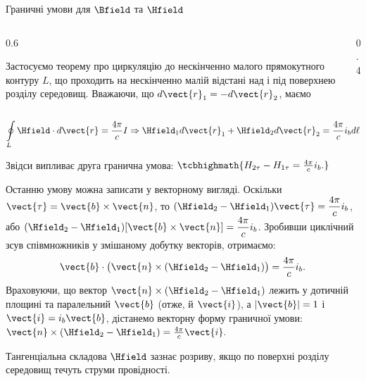 \documentclass[onlytextwidth]{beamer}
\begin{document}
\begin{frame}{Граничні умови для $\Bfield$ та $\Hfield$}{}
\begin{onlyenv}
\begin{columns}
\begin{column}{0.6\linewidth}
\begin{block}{}
					Застосуємо теорему про циркуляцію до нескінченно малого прямокутного
					контуру $L$, що проходить на нескінченно малій відстані над і під поверхнею
					розділу середовищ. Вважаючи, що $d\vect{r}_1 = -d\vect{r}_2$, маємо
				\end{block}
			\end{column}
			\begin{column}{0.4\linewidth}\centering
				
			\end{column}
		\end{columns}
		\begin{block}{}
			\begin{equation*}
				\oint\limits_L \Hfield\cdot d\vect{r} = \frac{4\pi}cI \Rightarrow \Hfield_1 d\vect{r}_1 +
				\Hfield_2 d\vect{r}_2 = \frac{4\pi}c i_b d\ell
			\end{equation*}
		\end{block}
		\begin{block}{}
			Звідси випливає друга гранична умова:
			\(
			\tcbhighmath{
				H_{2\tau} - H_{1\tau} = \frac{4\pi}c i_b.
			}
			\)
		\end{block}
		\begin{block}{}\justifying\scriptsize
			Останню умову можна записати у векторному вигляді. Оскільки
			$\vect{\tau}=\vect{b}\times\vect{n}$, то
			$(\Hfield_2-\Hfield_1)\vect{\tau}=\dfrac{4\pi}{c}i_b$, або
			$(\Hfield_2-\Hfield_1)[\vect{b}\times\vect{n}]=\dfrac{4\pi}{c}i_b$.
			Зробивши циклічний зсув співмножників у змішаному добутку векторів,
			отримаємо:
			\[
				\vect{b}\cdot\bigl(\vect{n}\times(\Hfield_2-\Hfield_1)\bigr)
				=\frac{4\pi}{c}i_b .
			\]
			Враховуючи, що вектор $\vect{n}\times(\Hfield_2-\Hfield_1)$ лежить
			у дотичній площині та паралельний $\vect{b}$ (отже, й $\vect{i}$),
			а $|\vect{b}|=1$ і $\vect{i}=i_b\vect{b}$, дістанемо векторну
			форму граничної умови:
			\(
			\vect{n}\times(\Hfield_2-\Hfield_1)=\frac{4\pi}{c}\vect{i}.
			\)
		\end{block}
		\begin{alertblock}{}\centering
			Тангенціальна складова $\Hfield$ зазнає розриву, якщо по поверхні розділу середовищ течуть \alert{струми провідності}.
		\end{alertblock}
	\end{onlyenv}
\end{frame}
\end{document}
